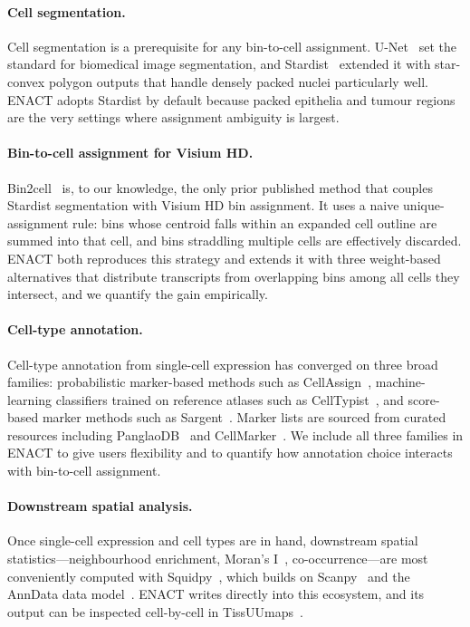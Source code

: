 \documentclass[11pt]{article}
\begin{document}
\paragraph{Cell segmentation.}
Cell segmentation is a prerequisite for any bin-to-cell assignment. U-Net~\cite{ronneberger2015unet} set the standard for biomedical image segmentation, and Stardist~\cite{schmidt2018stardist} extended it with star-convex polygon outputs that handle densely packed nuclei particularly well. ENACT adopts Stardist by default because packed epithelia and tumour regions are the very settings where assignment ambiguity is largest.

\paragraph{Bin-to-cell assignment for Visium HD.}
Bin2cell~\cite{polacco2024bin2cell} is, to our knowledge, the only prior published method that couples Stardist segmentation with Visium HD bin assignment. It uses a naive unique-assignment rule: bins whose centroid falls within an expanded cell outline are summed into that cell, and bins straddling multiple cells are effectively discarded. ENACT both reproduces this strategy and extends it with three weight-based alternatives that distribute transcripts from overlapping bins among all cells they intersect, and we quantify the gain empirically.

\paragraph{Cell-type annotation.}
Cell-type annotation from single-cell expression has converged on three broad families: probabilistic marker-based methods such as CellAssign~\cite{zhang2019probabilistic}, machine-learning classifiers trained on reference atlases such as CellTypist~\cite{conde2022celltypist}, and score-based marker methods such as Sargent~\cite{nouri2024sargent}. Marker lists are sourced from curated resources including PanglaoDB~\cite{franzen2019panglaodb} and CellMarker~\cite{zhang2019cellmarker}. We include all three families in ENACT to give users flexibility and to quantify how annotation choice interacts with bin-to-cell assignment.

\paragraph{Downstream spatial analysis.}
Once single-cell expression and cell types are in hand, downstream spatial statistics---neighbourhood enrichment, Moran's I~\cite{moran1950notes}, co-occurrence---are most conveniently computed with Squidpy~\cite{palla2022squidpy}, which builds on Scanpy~\cite{wolf2018scanpy} and the AnnData data model~\cite{virshup2024anndata}. ENACT writes directly into this ecosystem, and its output can be inspected cell-by-cell in TissUUmaps~\cite{pielawski2023tissuumaps}.
\end{document}
